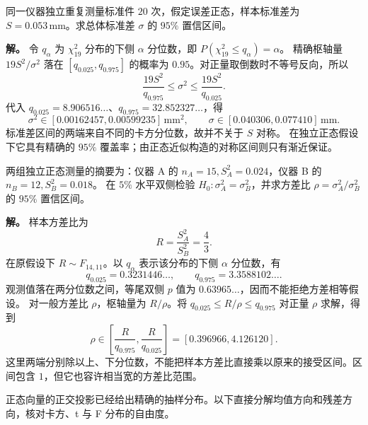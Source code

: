 \begin{exbox}[仪器精度的置信区间]
同一仪器独立重复测量标准件 $20$ 次，假定误差正态，样本标准差为 $S=0.053\,\si{\milli\metre}$。求总体标准差 $\sigma$ 的 $95\%$ 置信区间。

\textbf{解。} 令 $q_\alpha$ 为 $\chi^2_{19}$ 分布的下侧 $\alpha$ 分位数，即 $P(\chi^2_{19}\le q_\alpha)=\alpha$。
精确枢轴量 $19S^2/\sigma^2$ 落在 $[q_{0.025},q_{0.975}]$ 的概率为 $0.95$。对正量取倒数时不等号反向，所以
\[
 \frac{19S^2}{q_{0.975}}\le\sigma^2
 \le\frac{19S^2}{q_{0.025}}.
\]
代入 $q_{0.025}=8.906516\ldots$、$q_{0.975}=32.852327\ldots$，得
\[
 \sigma^2\in[0.00162457,0.00599235]\,\si{\milli\metre\squared},
 \qquad\sigma\in[0.040306,0.077410]\,\si{\milli\metre}.
\]
标准差区间的两端来自不同的卡方分位数，故并不关于 $S$ 对称。
在独立正态假设下它具有精确的 $95\%$ 覆盖率；由正态近似构造的对称区间则只有渐近保证。
\end{exbox}
\begin{exbox}[两种仪器精度比较]
两组独立正态测量的摘要为：仪器 A 的 $n_A=15,S_A^2=0.024$，仪器 B 的 $n_B=12,S_B^2=0.018$。
在 $5\%$ 水平双侧检验 $H_0:\sigma_A^2=\sigma_B^2$，并求方差比 $\rho=\sigma_A^2/\sigma_B^2$ 的 $95\%$ 置信区间。

\textbf{解。} 样本方差比为
\[
 R=\frac{S_A^2}{S_B^2}=\frac43.
\]
在原假设下 $R\sim F_{14,11}$。以 $q_\alpha$ 表示该分布的下侧 $\alpha$ 分位数，有
\[
 q_{0.025}=0.3231446\ldots,\qquad
 q_{0.975}=3.3588102\ldots.
\]
观测值落在两分位数之间，等尾双侧 $p$ 值为 $0.63965\ldots$，因而不能拒绝方差相等假设。
对一般方差比 $\rho$，枢轴量为 $R/\rho$。将
$q_{0.025}\le R/\rho\le q_{0.975}$ 对正量 $\rho$ 求解，得到
\[
 \rho\in\left[\frac{R}{q_{0.975}},\frac{R}{q_{0.025}}\right]
 =[0.396966,4.126120].
\]
这里两端分别除以上、下分位数，不能把样本方差比直接乘以原来的接受区间。区间包含 $1$，但它也容许相当宽的方差比范围。
\end{exbox}
正态向量的正交投影已经给出精确的抽样分布。以下直接分解均值方向和残差方向，核对卡方、t 与 F 分布的自由度。



